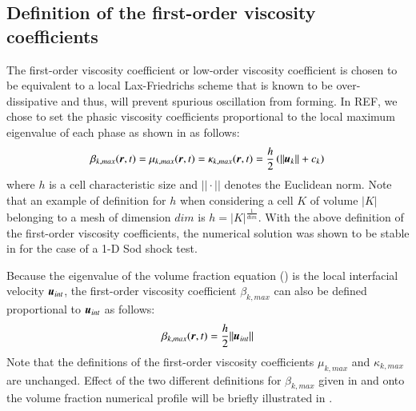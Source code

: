 \documentclass[preprint,10pt]{elsarticle}
\begin{document}
\subsection{Definition of the first-order viscosity coefficients}\label{sec:visc-coeff-fo}
%
The first-order viscosity coefficient or low-order viscosity coefficient is chosen to be equivalent to a local Lax-Friedrichs scheme that is known to be over-
dissipative and thus, will prevent spurious oscillation from forming. In REF, we chose to set the phasic viscosity 
coefficients proportional to the local maximum eigenvalue of each phase as shown in  as follows:
%
\begin{equation}\label{eq:visc-coeff-fo-def-1}
\beta_{k,max}(\boldsymbol r,t) = \mu_{k,max}(\boldsymbol r,t) = \kappa_{k,max}(\boldsymbol r,t) = \frac{h}{2} \left( || \boldsymbol u_k || + c_k \right)
\end{equation}
%
where $h$ is a cell characteristic size and $|| \cdot ||$ denotes the Euclidean norm. Note that an example of definition for $h$ when considering a 
cell $K$ of volume $|K|$ belonging to a mesh of dimension 
$dim$ is $h = |K|^\frac{1}{dim}$. With the above definition of the first-order viscosity coefficients, the numerical solution was shown to be stable in \cite{Marco_paper_sem} for the case of a 1-D Sod shock test. 
%
\begin{remark}
Because the eigenvalue of the volume fraction equation () is the local interfacial velocity $\boldsymbol u_{int}$,
the first-order viscosity coefficient $\beta_{k,max}$ can also be defined proportional to $\boldsymbol u_{int}$ as follows:
%
\begin{equation}\label{eq:visc-coeff-fo-def-2}
\beta_{k,max}(\boldsymbol r,t) = \frac{h}{2} || \boldsymbol u_{int} ||
\end{equation}
%
Note that the definitions of the first-order viscosity coefficients $\mu_{k,max}$ and $\kappa_{k,max}$ are unchanged.
Effect of the two different definitions for $\beta_{k,max}$ given in  and  onto the volume fraction numerical 
profile will be briefly illustrated in .
\end{remark}
%
\end{document}

